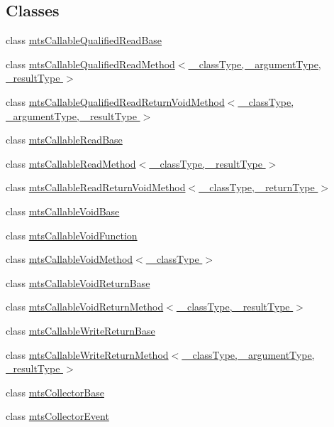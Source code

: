 \subsection*{Classes}
\begin{DoxyCompactItemize}
\item 
class \hyperlink{classmts_callable_qualified_read_base}{mts\-Callable\-Qualified\-Read\-Base}
\item 
class \hyperlink{classmts_callable_qualified_read_method}{mts\-Callable\-Qualified\-Read\-Method$<$ \-\_\-class\-Type, \-\_\-argument\-Type, \-\_\-result\-Type $>$}
\item 
class \hyperlink{classmts_callable_qualified_read_return_void_method}{mts\-Callable\-Qualified\-Read\-Return\-Void\-Method$<$ \-\_\-class\-Type, \-\_\-argument\-Type, \-\_\-result\-Type $>$}
\item 
class \hyperlink{classmts_callable_read_base}{mts\-Callable\-Read\-Base}
\item 
class \hyperlink{classmts_callable_read_method}{mts\-Callable\-Read\-Method$<$ \-\_\-class\-Type, \-\_\-result\-Type $>$}
\item 
class \hyperlink{classmts_callable_read_return_void_method}{mts\-Callable\-Read\-Return\-Void\-Method$<$ \-\_\-class\-Type, \-\_\-return\-Type $>$}
\item 
class \hyperlink{classmts_callable_void_base}{mts\-Callable\-Void\-Base}
\item 
class \hyperlink{classmts_callable_void_function}{mts\-Callable\-Void\-Function}
\item 
class \hyperlink{classmts_callable_void_method}{mts\-Callable\-Void\-Method$<$ \-\_\-class\-Type $>$}
\item 
class \hyperlink{classmts_callable_void_return_base}{mts\-Callable\-Void\-Return\-Base}
\item 
class \hyperlink{classmts_callable_void_return_method}{mts\-Callable\-Void\-Return\-Method$<$ \-\_\-class\-Type, \-\_\-result\-Type $>$}
\item 
class \hyperlink{classmts_callable_write_return_base}{mts\-Callable\-Write\-Return\-Base}
\item 
class \hyperlink{classmts_callable_write_return_method}{mts\-Callable\-Write\-Return\-Method$<$ \-\_\-class\-Type, \-\_\-argument\-Type, \-\_\-result\-Type $>$}
\item 
class \hyperlink{classmts_collector_base}{mts\-Collector\-Base}
\item 
class \hyperlink{classmts_collector_event}{mts\-Collector\-Event}

\end{DoxyCompactItemize}
